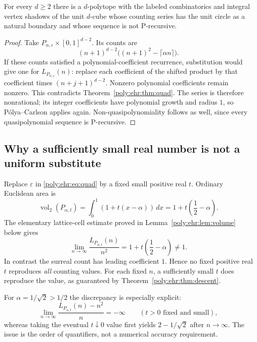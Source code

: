 \documentclass[11pt,a4paper]{article}
\numberwithin{equation}{section}
\theoremstyle{plain}
\newcommand{\eps}{\varepsilon}
\newcommand{\vol}{\operatorname{vol}}
\begin{document}
\begin{corollary}\label{poly:ehr:cor:dimensions}
For every $d\geq2$ there is a $d$-polytope with the labeled combinatorics
and integral vertex shadows of the unit $d$-cube whose counting series has
the unit circle as a natural boundary and whose sequence is not P-recursive.
\end{corollary}
\begin{proof}
Take $P_{\alpha,\eps}\times[0,1]^{d-2}$. Its counts are
\[
 (n+1)^{d-2}\bigl((n+1)^2-\lceil\alpha n\rceil\bigr).
\]
If these counts satisfied a polynomial-coefficient recurrence, substitution
would give one for $L_{P_{\alpha,\eps}}(n)$: replace each coefficient of
the shifted product by that coefficient times $(n+j+1)^{d-2}$. Nonzero
polynomial coefficients remain nonzero. This contradicts
Theorem~\ref{poly:ehr:thm:quad}. The series is therefore nonrational; its integer
coefficients have polynomial growth and radius $1$, so P\'olya--Carlson
applies again. Non-quasipolynomiality follows as well, since every
quasipolynomial sequence is P-recursive.
\end{proof}

\subsection{Why a sufficiently small real number is not a uniform substitute}

Replace $\eps$ in \eqref{poly:ehr:eq:quad} by a fixed small positive real $t$.
Ordinary Euclidean area is
\begin{equation}\label{poly:ehr:eq:area}
 \vol_2(P_{\alpha,t})
   =\int_0^1(1+t(x-\alpha))\,dx
   =1+t\left(\frac12-\alpha\right).
\end{equation}
The elementary lattice-cell estimate proved in Lemma~\ref{poly:ehr:lem:volume}
below gives
\[
 \lim_{n\to\infty}\frac{L_{P_{\alpha,t}}(n)}{n^2}
       =1+t\left(\frac12-\alpha\right)\ne1.
\]
In contrast the surreal count has leading coefficient $1$. Hence no fixed
positive real $t$ reproduces \emph{all} counting values. For each fixed
$n$, a sufficiently small $t$ does reproduce the value, as guaranteed by
Theorem~\ref{poly:ehr:thm:descent}.

For $\alpha=1/\sqrt2>1/2$ the discrepancy is especially explicit:
\[
 \lim_{n\to\infty}\frac{L_{P_{\alpha,t}}(n)-n^2}{n}=-\infty
                         \qquad(t>0\text{ fixed and small}),
\]
whereas taking the eventual $t\downarrow0$ value first yields
$2-1/\sqrt2$ after $n\to\infty$. The issue is the order of quantifiers,
not a numerical accuracy requirement.
\end{document}
